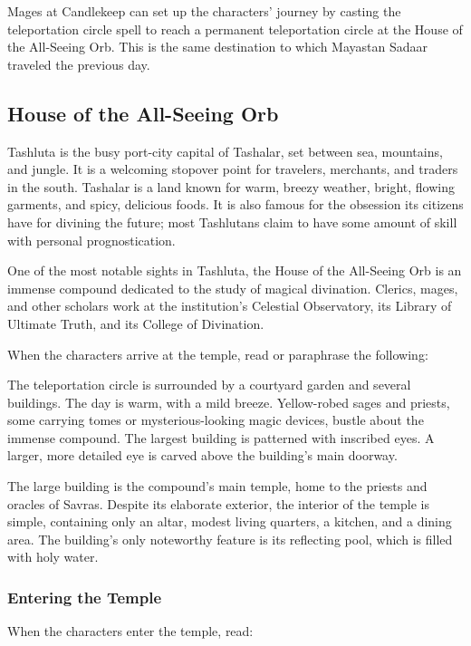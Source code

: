 \documentclass[10pt,a4paper,twoside,bg=print,twocolumn,openany,nodeprecatedcode]{dndbook}
\begin{document}
Mages at Candlekeep can set up the characters' journey by casting the teleportation circle spell to reach a permanent teleportation circle at the House of the All-Seeing Orb. This is the same destination to which Mayastan Sadaar traveled the previous day.

\subsection{House of the All-Seeing Orb}
Tashluta is the busy port-city capital of Tashalar, set between sea, mountains, and jungle. It is a welcoming stopover point for travelers, merchants, and traders in the south. Tashalar is a land known for warm, breezy weather, bright, flowing garments, and spicy, delicious foods. It is also famous for the obsession its citizens have for divining the future; most Tashlutans claim to have some amount of skill with personal prognostication.

One of the most notable sights in Tashluta, the House of the All-Seeing Orb is an immense compound dedicated to the study of magical divination. Clerics, mages, and other scholars work at the institution's Celestial Observatory, its Library of Ultimate Truth, and its College of Divination.

When the characters arrive at the temple, read or paraphrase the following:

\begin{DndReadAloud}{}
The teleportation circle is surrounded by a courtyard garden and several buildings. The day is warm, with a mild breeze. Yellow-robed sages and priests, some carrying tomes or mysterious-looking magic devices, bustle about the immense compound. The largest building is patterned with inscribed eyes. A larger, more detailed eye is carved above the building's main doorway.

\end{DndReadAloud}

The large building is the compound's main temple, home to the priests and oracles of Savras. Despite its elaborate exterior, the interior of the temple is simple, containing only an altar, modest living quarters, a kitchen, and a dining area. The building's only noteworthy feature is its reflecting pool, which is filled with holy water.

\subsubsection{Entering the Temple}
When the characters enter the temple, read:
\end{document}
